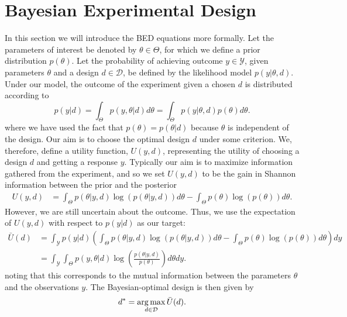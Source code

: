 
\section{Bayesian Experimental Design}
\label{sec:design:bed}

In this section we will introduce the BED equations more formally.
Let the parameters of interest be denoted by $\theta \in \Theta$, for which we define a prior distribution $p(\theta)$.
Let the probability of achieving outcome $y\in\mathcal{Y}$, given parameters $\theta$ 
and a design $d \in \mathcal{D}$, be defined by the likelihood model $p(y | \theta, d)$.
Under our model, the outcome of the experiment given a chosen $d$ is distributed according to
\begin{equation}
\label{eq:marginal_def}
p(y | d) = \int_{\Theta} p(y,\theta | d) d\theta = \int_{\Theta} p(y | \theta, d) p(\theta) d\theta.
\end{equation}
where we have used the fact that $p(\theta)=p(\theta|d)$ because $\theta$ is independent of the design.
Our aim is to choose the optimal design $d$ under some criterion. 
We, therefore, define a utility function, $U(y,d)$, representing the utility of choosing a design $d$ 
and getting a response $y$.
Typically our aim is to maximize information gathered from the experiment, and so we set 
$U(y,d)$ to be the gain in Shannon information between the prior and the posterior
\begin{align}
\label{eq:shannon_inf}
U(y,d) &= \int_{\Theta} p(\theta |y, d) \log(p(\theta |y, d)) d\theta -\int_{\Theta} p(\theta) \log(p(\theta))d\theta.
\end{align}
However, we are still uncertain about the outcome. Thus, we use the expectation of $U(y,d)$ with respect to $p(y | d)$
as our target:
\begin{align}
\bar{U}(d) 
&=\int_{\mathcal{Y}} p(y|d) \left(
\int_{\Theta} p(\theta | y, d)\log(p(\theta |y, d)) d\theta - 
\int_{\Theta} p(\theta) \log(p(\theta)) d\theta \right) dy \nonumber\\
&=\int_{\mathcal{Y}}\int_{\Theta} p(y,\theta | d)\log\left(\frac{p(\theta |y, d)}{p(\theta)}\right)d\theta dy. 
\label{eq:u_bar_1}
\end{align}
noting that this corresponds to the mutual information between the parameters $\theta$ and
the observations $y$.  The Bayesian-optimal design is then given by
\begin{equation}
\label{eq:d_star}
d^* = \operatorname*{arg\,max}_{d \in \mathcal{D}} \bar{U}(d).
\end{equation}
